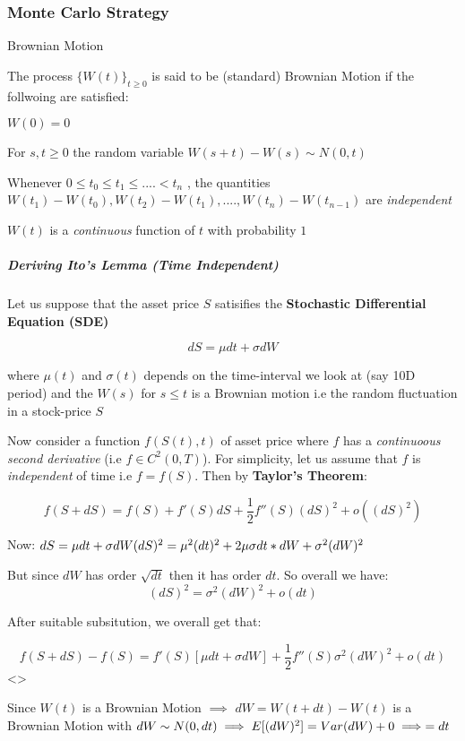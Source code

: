\subsubsection{Monte Carlo Strategy}\label{monte-carlo-strategy}

Brownian Motion

The process $\{W(t)\}_{t\geq0}$ is said to be (standard) Brownian Motion
if the follwoing are satisfied:

$W(0)=0$

For $s,t\geq0$ the random variable $W(s+t)-W(s) \sim N(0,t)$

Whenever $0\leq t_0\leq t_1\leq....<t_n$ , the quantities
$W(t_1)-W(t_0),W(t_2)-W(t_1),....,W(t_n)-W(t_{n-1})$ are
\emph{independent}

$W(t)$ is a \emph{continuous} function of $t$ with probability $1$

\subparagraph{Deriving Ito's Lemma (\emph{Time
Independent})}\label{deriving-itos-lemma-time-independent}

Let us suppose that the asset price $S$ satisifies the
\textbf{Stochastic Differential Equation (SDE)}

\[ dS = \mu dt + \sigma dW \]

where $\mu (t)$ and $\sigma(t)$ depends on the time-interval we look at
(say 10D period) and the $W(s)$ for $s\leq t$ is a Brownian motion i.e
the random fluctuation in a stock-price $S$

Now consider a function $f(S(t),t)$ of asset price where $f$ has a
\emph{continuoous second derivative} (i.e $f\in C^2 (0,T)$). For
simplicity, let us assume that $f$ is \emph{independent} of time i.e
$f=f(S)$. Then by \textbf{Taylor's Theorem}:

\[ f(S+dS) = f(S) + f'(S)dS + \frac{1}{2}f''(S)(dS)^2+o((dS)^2) \]

Now:
$dS = \mu dt + \sigma dW \\ (dS)^2 = \mu^2(dt)^2+2\mu\sigma dt*dW + \sigma^2(dW)^2$

But since $dW$ has order $\sqrt{dt}$ then it has order $dt$. So overall
we have: \[ (dS)^2 = \sigma^2(dW)^2 + o(dt)\]

After suitable subsitution, we overall get that:

\[ f(S+dS) - f(S) = f'(S)[\mu dt+\sigma dW] + \frac{1}{2}f''(S)\sigma^2(dW)^2 + o(dt) \]
\textless{}\p\textgreater{}

Since $W(t)$ is a Brownian Motion $\implies$ $dW=W(t+dt) - W(t)$ is a
Brownian Motion with
$dW \sim N(0,dt) \\ \implies E[(dW)^2]= Var(dW)+0 \\ \implies =dt$

